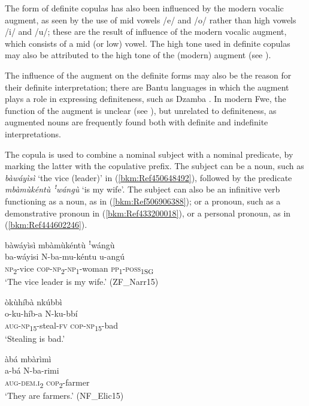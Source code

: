 The form of definite copulas has also been influenced by the modern vocalic augment, as seen by the use of mid vowels /e/ and /o/ rather than high vowels /i/ and /u/; these are the result of influence of the modern vocalic augment, which consists of a mid (or low) vowel. The high tone used in definite copulas may also be attributed to the high tone of the (modern) augment (see ).

The influence of the augment on the definite forms may also be the reason for their definite interpretation; there are Bantu languages in which the augment plays a role in expressing definiteness, such as Dzamba \citep{Bokamba1971}. In modern Fwe, the function of the augment is unclear (see ), but unrelated to definiteness, as augmented nouns are frequently found both with definite and indefinite interpretations.

The copula is used to combine a nominal subject with a nominal predicate, by marking the latter with the copulative prefix. The subject can be a noun, such as \textit{bàwáyìsì} ‘the vice (leader)’ in (\ref{bkm:Ref450648492}), followed by the predicate \textit{mbàmùkéntù ꜝ}\textit{wángù} ‘is my wife’. The subject can also be an infinitive verb functioning as a noun, as in (\ref{bkm:Ref506906388}); or a pronoun, such as a demonstrative pronoun in (\ref{bkm:Ref433200018}), or a personal pronoun, as in (\ref{bkm:Ref444602246}).

\ea
\label{bkm:Ref450648492}
bàwáyìsì mbàmùkéntù ꜝwángù\\
\gll ba-wáyisi  N-ba-mu-kéntu    u-angú\\
\textsc{np}\textsubscript{2}-vice  \textsc{cop}-\textsc{np}\textsubscript{2}-\textsc{np}\textsubscript{1}-woman  \textsc{pp}\textsubscript{1}-\textsc{poss}\textsubscript{1SG}\\
\glt ‘The vice leader is my wife.’ (ZF\_Narr15)
\z

\ea
\label{bkm:Ref506906388}
òkùhíbà nkúbbì\\
\gll o-ku-híb-a    N-ku-bbí\\
\textsc{aug}-\textsc{np}\textsubscript{15}-steal-\textsc{fv}  \textsc{cop}-\textsc{np}\textsubscript{15}-bad\\
\glt ‘Stealing is bad.’
\z

\ea
\label{bkm:Ref433200018}
àbá mbàrìmì\\
\gll a-bá    N-ba-rimi\\
\textsc{aug}-\textsc{dem}.\textsc{i}\textsubscript{2}  \textsc{cop}\textsubscript{2}-farmer\\
\glt ‘They are farmers.’ (NF\_Elic15)
\z

